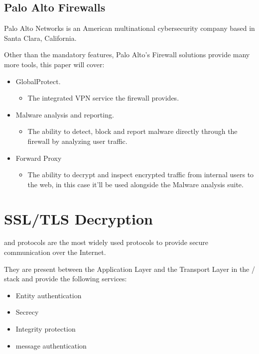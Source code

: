 \newpage

\subsection{Palo Alto Firewalls}

Palo Alto Networks is an American multinational cybersecurity company based in Santa Clara, California.

Other than the mandatory  features, Palo Alto's Firewall solutions provide many more tools, this paper will cover\cite{panos-features}:

\begin{itemize}
    \item GlobalProtect.
    \begin{itemize}
     \item The integrated VPN service the firewall provides.
    \end{itemize}
    \item Malware analysis and reporting.
    \begin{itemize}
     \item The ability to detect, block and report malware directly through the firewall by analyzing user traffic.
    \end{itemize}
    \item {} Forward Proxy
    \begin{itemize}
     \item The ability to decrypt and inspect encrypted traffic from internal users to the web, in this case it'll be used alongside the Malware analysis suite.
    \end{itemize}

\end{itemize}

\newpage

\section{SSL/TLS Decryption}

 and  protocols are the most widely used protocols to provide secure communication over the Internet.

They are present between the Application Layer and the Transport Layer in the / stack and provide the following services:

\begin{itemize}
 \item Entity authentication
 \item Secrecy
 \item Integrity protection
 \item message authentication
\end{itemize}



